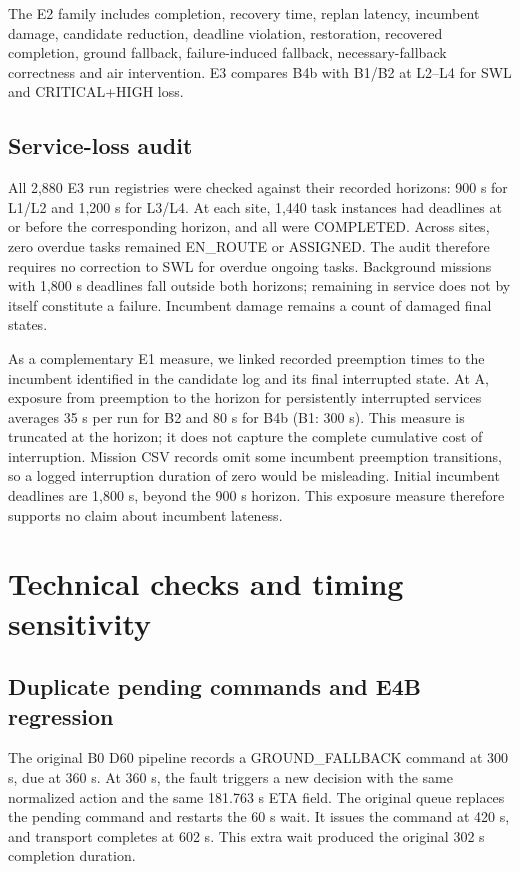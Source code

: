 \documentclass[11pt,a4paper]{article}
\begin{document}
The E2 family includes completion, recovery time, replan latency, incumbent damage, candidate reduction, deadline violation, restoration, recovered completion, ground fallback, failure-induced fallback, necessary-fallback correctness and air intervention. E3 compares B4b with B1/B2 at L2--L4 for SWL and CRITICAL+HIGH loss.

\begingroup
\setlength{\intextsep}{6pt}
\setlength{\belowcaptionskip}{3pt}

\endgroup

\subsection{Service-loss audit}

All 2,880 E3 run registries were checked against their recorded horizons: 900 s for L1/L2 and 1,200 s for L3/L4. At each site, 1,440 task instances had deadlines at or before the corresponding horizon, and all were COMPLETED. Across sites, zero overdue tasks remained EN\_ROUTE or ASSIGNED. The audit therefore requires no correction to SWL for overdue ongoing tasks. Background missions with 1,800 s deadlines fall outside both horizons; remaining in service does not by itself constitute a failure. Incumbent damage remains a count of damaged final states.

As a complementary E1 measure, we linked recorded preemption times to the incumbent identified in the candidate log and its final interrupted state. At A, exposure from preemption to the horizon for persistently interrupted services averages 35 s per run for B2 and 80 s for B4b (B1: 300 s). This measure is truncated at the horizon; it does not capture the complete cumulative cost of interruption. Mission CSV records omit some incumbent preemption transitions, so a logged interruption duration of zero would be misleading. Initial incumbent deadlines are 1,800 s, beyond the 900 s horizon. This exposure measure therefore supports no claim about incumbent lateness.

\section{Technical checks and timing sensitivity}

\subsection{Duplicate pending commands and E4B regression}

The original B0 D60 pipeline records a GROUND\_FALLBACK command at 300 s, due at 360 s. At 360 s, the fault triggers a new decision with the same normalized action and the same 181.763 s ETA field. The original queue replaces the pending command and restarts the 60 s wait. It issues the command at 420 s, and transport completes at 602 s. This extra wait produced the original 302 s completion duration.
\end{document}
